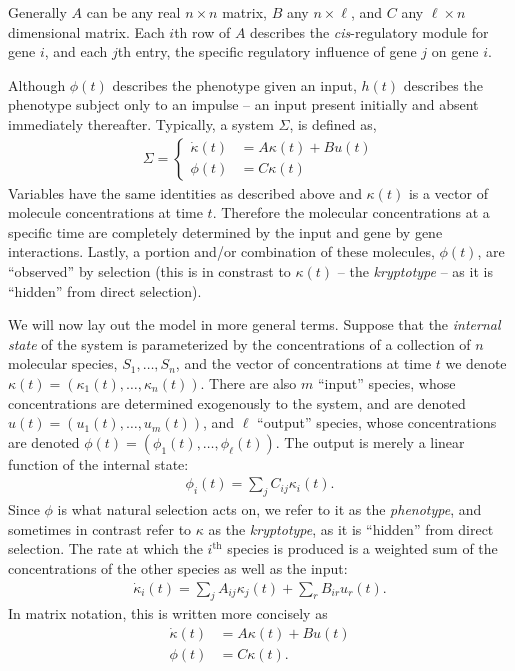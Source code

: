 \documentclass[9 pt]{article}
\newcommand{\ddt}{\dot}
\newcommand{\1}{\mathbbm{1}}
\begin{document}
  Generally $A$ can be any real $n \times n$ matrix, $B$ any $n \times \ell$, and $C$ any $\ell \times n$ dimensional matrix. Each $i$th row of $A$ describes the \emph{cis}-regulatory module for gene $i$, and each $j$th entry, the specific regulatory influence of gene $j$ on gene $i$. 

  Although $\phi(t)$ describes the phenotype given an input, $h(t)$ describes the phenotype subject only to an impulse -- an input present initially and absent immediately thereafter. Typically, a system $\Sigma$, is defined as,
  \begin{align}
    \Sigma = \left\{ \begin{array}{ll} \dot{\kappa}(t) &= A \kappa(t) + B u(t) \\ \phi(t) &= C \kappa(t) \end{array} \right.
  \end{align}
  Variables have the same identities as described above and $\kappa(t)$ is a vector of molecule concentrations at time $t$. Therefore the molecular concentrations at a specific time are completely determined by the input and gene by gene interactions. Lastly, a portion and/or combination of these molecules, $\phi(t)$, are ``observed'' by selection (this is in constrast to $\kappa(t)$ -- the \emph{kryptotype} -- as it is ``hidden'' from direct selection).


We will now lay out the model in more general terms.
Suppose that the \emph{internal state} of the system
is parameterized by the concentrations of a collection of $n$ molecular species,
$S_1, \ldots, S_n$,
and the vector of concentrations at time $t$ we denote $\kappa(t)=(\kappa_1(t),\ldots,\kappa_n(t))$.
There are also $m$ ``input'' species, whose concentrations are determined
exogenously to the system,
and are denoted $u(t) = (u_1(t),\ldots,u_m(t))$,
and $\ell$ ``output'' species, whose concentrations are denoted
$\phi(t) = (\phi_1(t),\ldots,\phi_\ell(t))$.
The output is merely a linear function of the internal state:
\begin{align*}
    \phi_i(t) = \sum_j C_{ij} \kappa_i(t).
\end{align*}
Since $\phi$ is what natural selection acts on, we refer to it as the \emph{phenotype},
and sometimes in contrast refer to $\kappa$ as the \emph{kryptotype},
as it is ``hidden'' from direct selection.
The rate at which the $i^\text{th}$ species is produced
is a weighted sum of the concentrations of the other species
as well as the input:
\begin{align*}
    \ddt \kappa_i(t) = \sum_j A_{ij} \kappa_j(t) + \sum_r B_{ir} u_r(t) .
\end{align*}
In matrix notation, this is written more concisely as
\begin{align} \label{eqn:lti_system}
    \ddt \kappa(t) &= A \kappa(t) + B u(t) \\
    \phi(t) &= C \kappa(t) .
\end{align}
\end{document}
